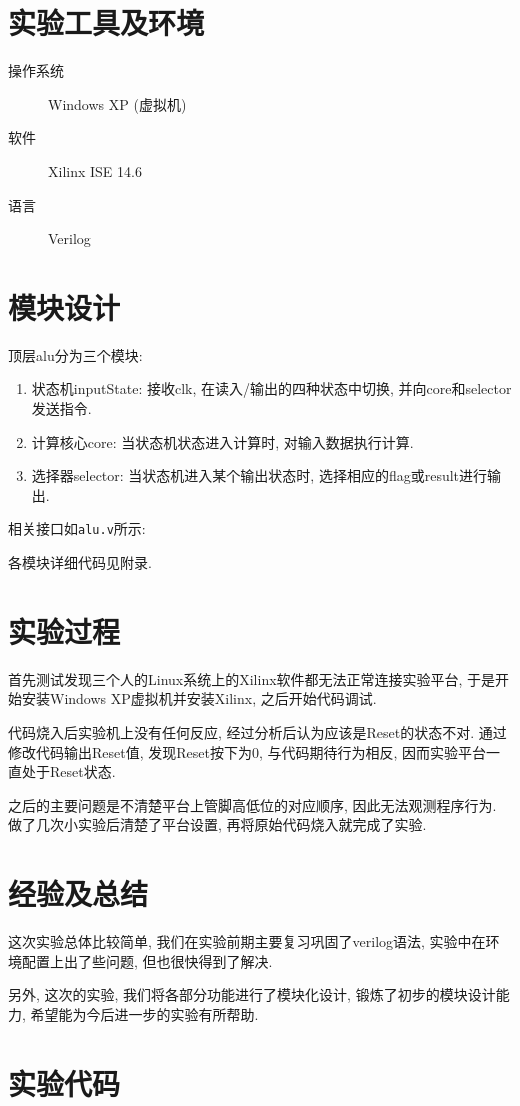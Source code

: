 
\section{实验工具及环境}
\begin{description}
  \item[操作系统] Windows XP (虚拟机)
  \item[软件] Xilinx ISE 14.6
  \item[语言] Verilog
\end{description}

\section{模块设计}
顶层alu分为三个模块:
\begin{enumerate}
  \item 状态机inputState: 接收clk, 在读入/输出的四种状态中切换, 并向core和selector发送指令.
  \item 计算核心core: 当状态机状态进入计算时, 对输入数据执行计算.
  \item 选择器selector: 当状态机进入某个输出状态时, 选择相应的flag或result进行输出.
\end{enumerate}
相关接口如\verb|alu.v|所示:

各模块详细代码见附录.

\section{实验过程}
首先测试发现三个人的Linux系统上的Xilinx软件都无法正常连接实验平台,
于是开始安装Windows XP虚拟机并安装Xilinx, 之后开始代码调试.

代码烧入后实验机上没有任何反应, 经过分析后认为应该是Reset的状态不对.
通过修改代码输出Reset值, 发现Reset按下为0, 与代码期待行为相反, 因而实验平台一直处于Reset状态.

之后的主要问题是不清楚平台上管脚高低位的对应顺序, 因此无法观测程序行为.
做了几次小实验后清楚了平台设置, 再将原始代码烧入就完成了实验.

\section{经验及总结}
这次实验总体比较简单, 我们在实验前期主要复习巩固了verilog语法,
实验中在环境配置上出了些问题, 但也很快得到了解决.

另外, 这次的实验, 我们将各部分功能进行了模块化设计,
锻炼了初步的模块设计能力, 希望能为今后进一步的实验有所帮助.

\section{实验代码}
